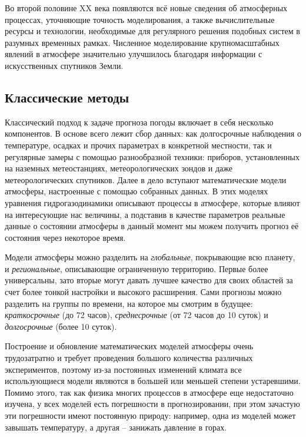 \documentclass[14pt]{matmex-diploma}
\begin{document}
Во второй половине XX века появляются всё новые сведения об атмосферных процессах, уточняющие точность моделирования, а также вычислительные ресурсы и технологии, необходимые для регулярного решения подобных систем в разумных временных рамках. Численное моделирование крупномасштабных явлений в атмосфере значительно улучшилось благодаря информации с искусственных спутников Земли\cite{васильев2008прогноз}.

\subsection{Классические методы}

% 

Классический подход к задаче прогноза погоды включает в себя несколько компонентов. В основе всего лежит сбор данных: как долгосрочные наблюдения о температуре, осадках и прочих параметрах в конкретной местности, так и регулярные замеры с помощью разнообразной техники: приборов, установленных на наземных метеостанциях, метеорологических зондов и даже метеорологических спутников. Далее в дело вступают математические модели атмосферы, настроенные с помощью собранных данных. В этих моделях уравнения гидрогазодинамики описывают процессы в атмосфере, которые влияют на интересующие нас величины, а подставив в качестве параметров реальные данные о состоянии атмосферы в данный момент мы можем получить прогноз её состояния через некоторое время.

Модели атмосферы можно разделить на \textit{глобальные}, покрывающие всю планету, и \textit{региональные}, описывающие ограниченную территорию. Первые более универсальны, зато вторые могут давать лучшее качество для своих областей за счет более тонкой настройки и высокого расширения. Сами прогнозы можно разделить на группы по времени, на которое мы смотрим в будущее: \textit{краткосрочные} (до 72 часов), \textit{среднесрочные} (от 72 часов до 10 суток) и \textit{долгосрочные} (более 10 суток).

Построение и обновление математических моделей атмосферы очень трудозатратно и требует проведения большого количества различных экспериментов, поэтому из-за постоянных изменений климата все использующиеся модели являются в большей или меньшей степени устаревшими. Помимо этого, так как физика многих процессов в атмосфере еще недостаточно изучена, у всех моделей есть погрешности в прогнозировании, при этом зачастую эти погрешности имеют постоянную природу: например, одна из моделей может завышать температуру, а другая -- занижать давление в горах. 
\end{document}
